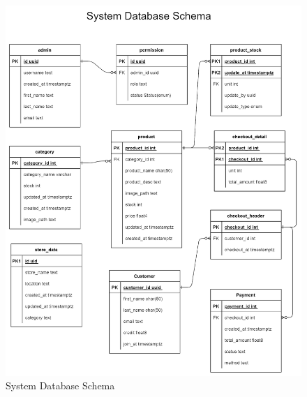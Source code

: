 \begin{figure}[h]
  \begin{center}

    \includegraphics[scale=0.3]{pic/diagram/database-er.png}
  \end{center}

  \caption[System Database Schema]{System Database Schema}
  \label{fig:Database Schema}
\end{figure}

